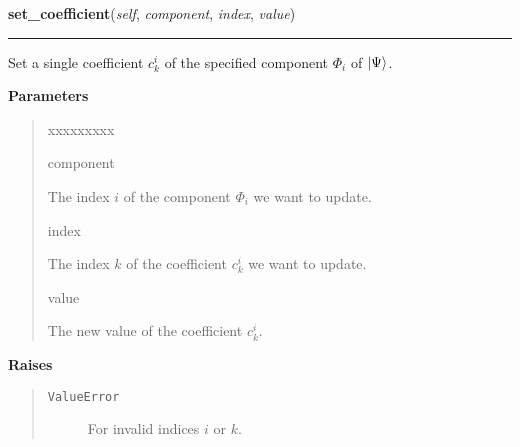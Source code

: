     \label{HagedornMultiWavepacket:HagedornMultiWavepacket:set_coefficient}

    \vspace{0.5ex}

\hspace{.8\funcindent}\begin{boxedminipage}{\funcwidth}

    \raggedright \textbf{set\_coefficient}(\textit{self}, \textit{component}, \textit{index}, \textit{value})

    \vspace{-1.5ex}

    \rule{\textwidth}{0.5\fboxrule}
\setlength{\parskip}{2ex}
    Set a single coefficient $c^i_k$ of the specified
    component $\Phi_i$ of
    $\Ket{\Psi}$.

\setlength{\parskip}{1ex}
      \textbf{Parameters}
      \vspace{-1ex}

      \begin{quote}
        \begin{Ventry}{xxxxxxxxx}

          \item[component]

          The index $i$ of the component $\Phi_i$ we
          want to update.

          \item[index]

          The index $k$ of the coefficient $c^i_k$ we
          want to update.

          \item[value]

          The new value of the coefficient $c^i_k$.

        \end{Ventry}

      \end{quote}

      \textbf{Raises}
    \vspace{-1ex}

      \begin{quote}
        \begin{description}

          \item[\texttt{ValueError}]

          For invalid indices $i$ or $k$.

        \end{description}

      \end{quote}

    \end{boxedminipage}

